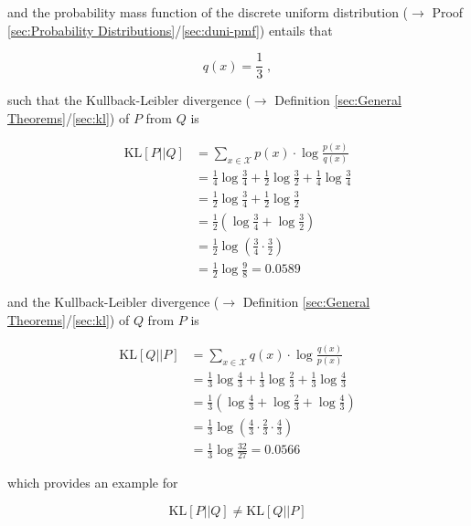 \documentclass[a4paper,12pt,twoside]{book}
\begin{document}
and the probability mass function of the discrete uniform distribution ($\rightarrow$ Proof \ref{sec:Probability Distributions}/\ref{sec:duni-pmf}) entails that

\begin{equation} \label{eq:kl-nonsymm-q(x)}
q(x) = \frac{1}{3} \; ,
\end{equation}

such that the Kullback-Leibler divergence ($\rightarrow$ Definition \ref{sec:General Theorems}/\ref{sec:kl}) of $P$ from $Q$ is

\begin{equation} \label{eq:kl-nonsymm-KL-P-Q}
\begin{split}
\mathrm{KL}[P||Q] &= \sum_{x \in \mathcal{X}} p(x) \cdot \log \frac{p(x)}{q(x)} \\
&= \frac{1}{4} \log \frac{3}{4} + \frac{1}{2} \log \frac{3}{2} + \frac{1}{4} \log \frac{3}{4} \\
&= \frac{1}{2} \log \frac{3}{4} + \frac{1}{2} \log \frac{3}{2} \\
&= \frac{1}{2} \left( \log \frac{3}{4} + \log \frac{3}{2} \right) \\
&= \frac{1}{2} \log \left( \frac{3}{4} \cdot \frac{3}{2} \right) \\
&= \frac{1}{2} \log \frac{9}{8} = 0.0589
\end{split}
\end{equation}

and the Kullback-Leibler divergence ($\rightarrow$ Definition \ref{sec:General Theorems}/\ref{sec:kl}) of $Q$ from $P$ is

\begin{equation} \label{eq:kl-nonsymm-KL-Q-P}
\begin{split}
\mathrm{KL}[Q||P] &= \sum_{x \in \mathcal{X}} q(x) \cdot \log \frac{q(x)}{p(x)} \\
&= \frac{1}{3} \log \frac{4}{3} + \frac{1}{3} \log \frac{2}{3} + \frac{1}{3} \log \frac{4}{3} \\
&= \frac{1}{3} \left( \log \frac{4}{3} + \log \frac{2}{3} + \log \frac{4}{3} \right) \\
&= \frac{1}{3} \log \left( \frac{4}{3} \cdot \frac{2}{3} \cdot \frac{4}{3} \right) \\
&= \frac{1}{3} \log \frac{32}{27} = 0.0566
\end{split}
\end{equation}

which provides an example for

\begin{equation} \label{eq:kl-nonsymm-KL-nonsymm-qed}
\mathrm{KL}[P||Q] \neq \mathrm{KL}[Q||P]
\end{equation}
\end{document}

